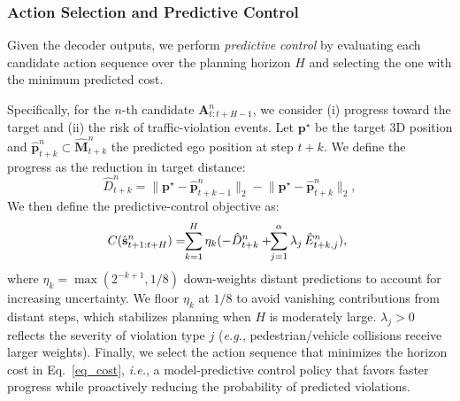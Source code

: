 \documentclass[twocolumn]{template}
\theoremstyle{thmstyleone}%
\theoremstyle{thmstyletwo}%
\theoremstyle{thmstylethree}%
\begin{document}
\subsubsection{Action Selection and Predictive Control}
Given the decoder outputs, we perform \emph{predictive control} by evaluating each candidate action sequence over the planning horizon $H$ and selecting the one with the minimum predicted cost.

Specifically, for the $n$-th candidate $\mathbf{A}^n_{t:t+H-1}$,
we consider (i) progress toward the target and (ii) the risk of traffic-violation events.
Let $\mathbf{p}^\star$ be the target 3D position and $\hat{\mathbf{p}}^{n}_{t+k}\subset\hat{\mathbf{M}}^{n}_{t+k}$ the predicted ego position at step $t+k$.
We define the progress as the reduction in target distance:
\begin{equation}
\hat{D}^{n}_{t+k} = \big\| \mathbf{p}^\star - \hat{\mathbf{p}}^{n}_{{t+k}-1} \big\|_2 - \big\| \mathbf{p}^\star - \hat{\mathbf{p}}^{n}_{{t+k}} \big\|_2,
\end{equation}
We then define the predictive-control objective as:
\begin{equation}
\setlength{\abovedisplayskip}{2pt}
\label{eq_cost}
\begin{aligned}
\!\!\!C(\hat{\mathbf{s}}^{n}_{t+1:t+H}) = \!\!\sum_{k=1}^H \eta_k (-\hat{D}^{n}_{t+k} + \!\!\sum_{j=1}^{\alpha} \lambda_j\, \hat{E}^{n}_{t+k,j}), \\
\end{aligned}
\setlength{\belowdisplayskip}{2pt}
\end{equation}
where $\eta_k=\max(2^{-k+1},1/8)$ down-weights distant predictions to account for increasing uncertainty. We floor $\eta_k$ at $1/8$ to avoid vanishing contributions from distant steps, which stabilizes planning when $H$ is moderately large. $\lambda_j>0$ reflects the severity of violation type $j$ (\textit{e.g.}, pedestrian/vehicle collisions receive larger weights).
Finally, we select the action sequence that minimizes the horizon cost in Eq.~\eqref{eq_cost},
\textit{i.e.}, a model-predictive control policy that favors faster progress while proactively reducing the probability of predicted violations.

\end{document}

